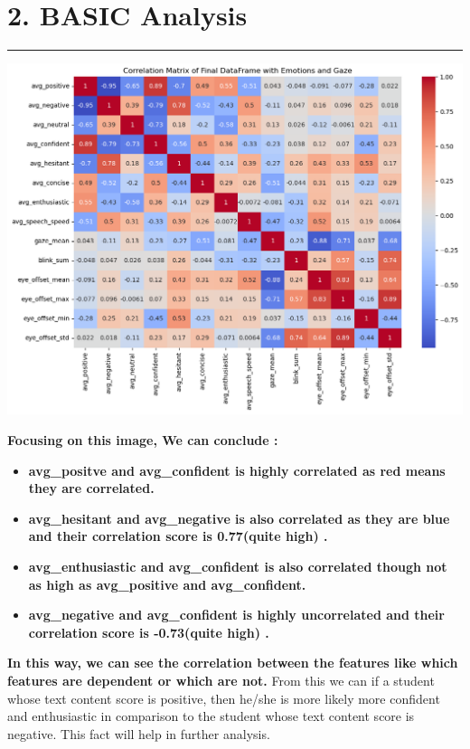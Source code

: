 \documentclass{article}
\begin{document}
\newpage
\section{2. BASIC Analysis}
  \begin{center}
        \color{red}\rule{1\linewidth}{1mm}
    \end{center}
    
\begin{center}
    \includegraphics[width=1\columnwidth]{images/corr_matrix_of_final_data.png}
    \caption{}
    \label{fig:enter-label}
\end{center}


\begin{tcolorbox}[colback=cyan!5!white,colframe=cyan!75!black,title= Insights from the correlation matrix]
\textbf{Focusing on this image, We can conclude :}
\begin{itemize}
    \item \textbf{avg\_positve and avg\_confident is highly correlated as red means they are correlated.}
    \item \textbf{avg\_hesitant and avg\_negative is also correlated as they are blue and their correlation score is 0.77(quite high) .}
    \item \textbf{avg\_enthusiastic and avg\_confident is also correlated though not as high as avg\_positive and avg\_confident.}
    \item \textbf{avg\_negative and avg\_confident is highly uncorrelated and their correlation score is -0.73(quite high) .}
\end{itemize}

\textbf{In this way, we can see the correlation between the features like which features are dependent or which are not.}
 From this we can if a student whose text content score is positive, then he/she is more likely more confident and enthusiastic
 in comparison to the student whose text content score is negative. This fact will help in further analysis.\\ 
    \vspace{0.2in}

\end{tcolorbox}
\end{document}
